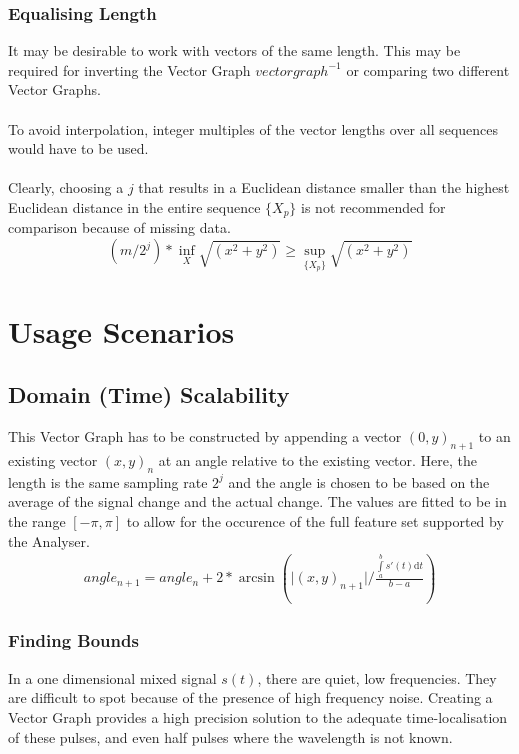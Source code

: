 \documentclass{report}
\begin{document}
\subsection{Equalising Length}
It may be desirable to work with vectors of the same length. This may be required for inverting the Vector Graph $vectorgraph^{-1}$ or comparing two different Vector Graphs.\\\\
To avoid interpolation, integer multiples of the vector lengths over all sequences would have to be used.\\\\
Clearly, choosing a $j$ that results in a Euclidean distance smaller than the highest Euclidean distance in the entire sequence $\{X_{p}\}$ is not recommended for comparison because of missing data.
\begin{equation}
(m/2^j)*\inf \limits _{X} \sqrt{(x^2+y^2)} \geq \sup \limits _{\{X_{p}\}} \sqrt{(x^2+y^2)}
\end{equation}

\chapter{Usage Scenarios}
\section{Domain (Time) Scalability}
This Vector Graph has to be constructed by appending a vector $(0,y)_{n+1}$ to an existing vector $(x,y)_{n}$ at an angle relative to the existing vector. Here, the length is the same sampling rate $2^j$ and the angle is chosen to be based on the average of the signal change and the actual change. The values are fitted to be in the range $[-\pi,\pi]$ to allow for the occurence of the full feature set supported by the Analyser.
\begin{align}
angle_{n+1}=angle_{n}+2*\arcsin(\vert(x,y)_{n+1}\vert/\frac{\int \limits _{a}^{b} s'(t) \mathrm{d}t}{b-a})
\end{align}
\subsection{Finding Bounds}
In a one dimensional mixed signal $s(t)$, there are quiet, low frequencies. They are difficult to spot because of the presence of high frequency noise. Creating a Vector Graph provides a high precision solution to the adequate time-localisation of these pulses, and even half pulses where the wavelength is not known.
\end{document}
